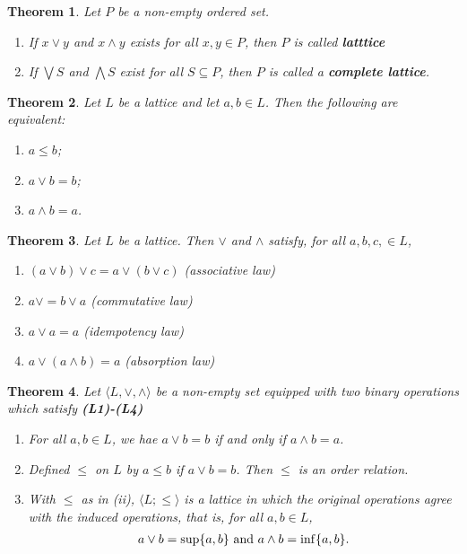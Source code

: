 \documentclass[a4paper,12pt,oneside]{report}%
\newtheorem{theorem}{Theorem}
\begin{document}
\begin{theorem}
Let $P$ be a non-empty ordered set.
    \begin{enumerate}
        \item If $x \vee y$ and $x \wedge y$ exists for all $x,y \in P$, then 
            $P$ is called \textbf{latttice}
        \item If $\bigvee S$ and $\bigwedge S$ exist for all $S \subseteq P$,
            then $P$ is called a \textbf{complete lattice}.
    \end{enumerate}
\end{theorem}

\begin{theorem}
Let $L$ be a lattice and let $a,b \in L$. Then the following are equivalent:
    \begin{enumerate}
        \item $a \leq b$;
        \item $a \vee b = b$;
        \item $a \wedge b = a$.
    \end{enumerate}
\end{theorem}

\begin{theorem}
Let $L$ be a lattice. Then $\vee$ and $\wedge$ satisfy, for all $a,b,c, \in L$,
    \begin{enumerate}[start=1,label={(\bfseries L\arabic*)}]
        \item $(a \vee b) \vee c = a \vee (b \vee c)$
            (associative law)
        \item $a \vee = b \vee a$
            (commutative law)
        \item $a \vee a = a$
            (idempotency law)
        \item $a \vee (a \wedge b) = a$
            (absorption law)
    \end{enumerate}
\end{theorem}

\begin{theorem}
Let $\langle L, \vee, \wedge \rangle$ be a non-empty set equipped with two
    binary operations which satisfy \textbf{(L1)-(L4)}
    \begin{enumerate}[label=(\roman*)]
        \item For all $a,b \in L$, we hae $a \vee b = b$ if and only if
            $a \wedge b = a$.
        \item Defined $\leq$ on $L$ by $a \leq b$ if $a \vee b = b$. Then
            $\leq$ is an order relation.
        \item With $\leq$ as in (ii), $\langle L; \leq \rangle$ is a lattice in
            which the original operations agree with the induced operations,
            that is, for all $a, b \in L$,
            \begin{align*}
                a \vee b = \sup \lbrace a, b \rbrace \textnormal{ and }
                a \wedge b = \inf \lbrace a, b \rbrace.
            \end{align*}
    \end{enumerate}
\end{theorem}
\end{document}
